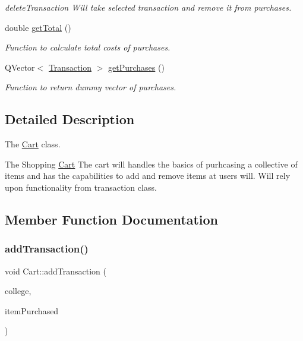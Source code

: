 \begin{DoxyCompactItemize}
\begin{DoxyCompactList}\small\item\em delete\+Transaction Will take selected transaction and remove it from purchases. \end{DoxyCompactList}\item 
double \mbox{\hyperlink{class_cart_a86b4dda9ec906b2949248ce1085285e1}{get\+Total}} ()
\begin{DoxyCompactList}\small\item\em Function to calculate total costs of purchases. \end{DoxyCompactList}\item 
Q\+Vector$<$ \mbox{\hyperlink{class_transaction}{Transaction}} $>$ \mbox{\hyperlink{class_cart_a3d7b1086c3a0ee0e9ae9c004f80fbc69}{get\+Purchases}} ()
\begin{DoxyCompactList}\small\item\em Function to return dummy vector of purchases. \end{DoxyCompactList}\end{DoxyCompactItemize}


\subsection{Detailed Description}
The \mbox{\hyperlink{class_cart}{Cart}} class. 

The Shopping \mbox{\hyperlink{class_cart}{Cart}} The cart will handles the basics of purhcasing a collective of items and has the capabilities to add and remove items at user\textquotesingle{}s will. Will rely upon functionality from transaction class. 

\subsection{Member Function Documentation}
\mbox{\label{class_cart_a751f19cb4df33a6a8c89f7e752cdb07d}} 
\subsubsection{\texorpdfstring{add\+Transaction()}{addTransaction()}}
{\footnotesize\ttfamily void Cart\+::add\+Transaction (\begin{DoxyParamCaption}\item[{\mbox{\hyperlink{struct_college}{College}}}]{college,  }\item[{\mbox{\hyperlink{structsouvenir_item}{souvenir\+Item}}}]{item\+Purchased }\end{DoxyParamCaption})}



